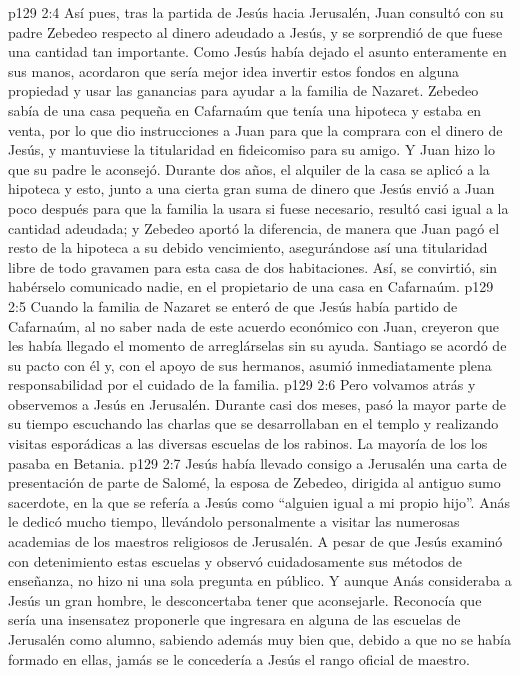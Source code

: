 \vs p129 2:4 Así pues, tras la partida de Jesús hacia Jerusalén, Juan consultó con su padre Zebedeo respecto al dinero adeudado a Jesús, y se sorprendió de que fuese una cantidad tan importante. Como Jesús había dejado el asunto enteramente en sus manos, acordaron que sería mejor idea invertir estos fondos en alguna propiedad y usar las ganancias para ayudar a la familia de Nazaret. Zebedeo sabía de una casa pequeña en Cafarnaúm que tenía una hipoteca y estaba en venta, por lo que dio instrucciones a Juan para que la comprara con el dinero de Jesús, y mantuviese la titularidad en fideicomiso para su amigo. Y Juan hizo lo que su padre le aconsejó. Durante dos años, el alquiler de la casa se aplicó a la hipoteca y esto, junto a una cierta gran suma de dinero que Jesús envió a Juan poco después para que la familia la usara si fuese necesario, resultó casi igual a la cantidad adeudada; y Zebedeo aportó la diferencia, de manera que Juan pagó el resto de la hipoteca a su debido vencimiento, asegurándose así una titularidad libre de todo gravamen para esta casa de dos habitaciones. Así, se convirtió, sin habérselo comunicado nadie, en el propietario de una casa en Cafarnaúm.
\vs p129 2:5 \pc Cuando la familia de Nazaret se enteró de que Jesús había partido de Cafarnaúm, al no saber nada de este acuerdo económico con Juan, creyeron que les había llegado el momento de arreglárselas sin su ayuda. Santiago se acordó de su pacto con él y, con el apoyo de sus hermanos, asumió inmediatamente plena responsabilidad por el cuidado de la familia.
\vs p129 2:6 \pc Pero volvamos atrás y observemos a Jesús en Jerusalén. Durante casi dos meses, pasó la mayor parte de su tiempo escuchando las charlas que se desarrollaban en el templo y realizando visitas esporádicas a las diversas escuelas de los rabinos. La mayoría de los  los pasaba en Betania.
\vs p129 2:7 Jesús había llevado consigo a Jerusalén una carta de presentación de parte de Salomé, la esposa de Zebedeo, dirigida al antiguo sumo sacerdote, en la que se refería a Jesús como “alguien igual a mi propio hijo”. Anás le dedicó mucho tiempo, llevándolo personalmente a visitar las numerosas academias de los maestros religiosos de Jerusalén. A pesar de que Jesús examinó con detenimiento estas escuelas y observó cuidadosamente sus métodos de enseñanza, no hizo ni una sola pregunta en público. Y aunque Anás consideraba a Jesús un gran hombre, le desconcertaba tener que aconsejarle. Reconocía que sería una insensatez proponerle que ingresara en alguna de las escuelas de Jerusalén como alumno, sabiendo además muy bien que, debido a que no se había formado en ellas, jamás se le concedería a Jesús el rango oficial de maestro.
